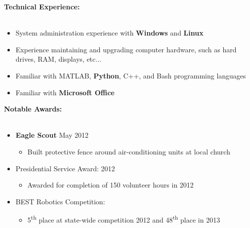 \documentclass[12pt]{article}
\begin{document}
\begin{flushleft}
\textbf{Technical Experience:}\\
\vspace{-11pt}\hrulefill\\\vspace{-1.1mm}
\begin{itemize}\vspace{-0mm}
\item System administration experience with \textbf{Windows} and \textbf{Linux}
\item Experience maintaining and upgrading computer hardware, such as hard drives, RAM, displays, etc...
\item Familiar with MATLAB, \textbf{Python}, C++, and Bash programming languages
\item Familiar with \textbf{Microsoft Office}
\end{itemize}

\textbf{Notable Awards:}\\
\vspace{-11pt}\hrulefill\\\vspace{-1.1mm}
\begin{itemize}\vspace{-0.3mm}
\item \textbf{Eagle Scout} \hfill May 2012\\
	\begin{itemize}\vspace{-1mm}
	\item Built protective fence around air-conditioning units at local church
	\end{itemize}\vspace{-1mm}
\item Presidential Service Award: \hfill 2012\\
	\begin{itemize}\vspace{-0mm}
	\item Awarded for completion of 150 volunteer hours in 2012
	\end{itemize}\vspace{-1mm}
\item BEST Robotics Competition:
	\begin{itemize}\vspace{-0mm}
	\item 5\textsuperscript{th} place at state-wide competition 2012 and 48\textsuperscript{th} place in 2013
	\end{itemize}\vspace{-1mm}
\end{itemize}

\end{flushleft}
\end{document}
